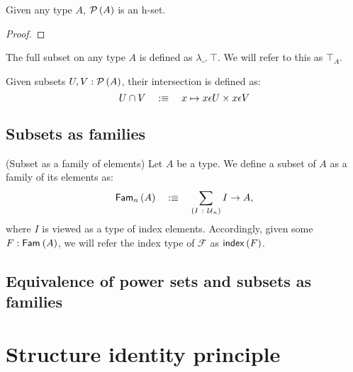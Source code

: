\begin{prop}\label{isSetPow}
  Given any type $A$, $\mathcal{P}\left(A\right)$ is an h-set.
\end{prop}
\begin{proof}
\end{proof}

\begin{defn}\label{defn:full-set}
  The full subset on any type $A$ is defined as $\lambda\_.~ \top$. We will refer to this as $\top_A$.
\end{defn}

\begin{defn}\label{defn:set-intersection}
  Given subsets $U, V : \mathcal{P}\left(A\right)$, their intersection is defined as:
  \begin{equation*}
    U \cap V \quad:\equiv\quad x \mapsto x \epsilon U \times x \epsilon V
  \end{equation*}
\end{defn}

\subsection{Subsets as families}

\begin{defn}(Subset as a family of elements)\label{defn:fam}
  Let $A$ be a type. We define a subset of $A$ as a family of its elements as:
  \begin{equation*}
    \mathsf{Fam}_{n}\left(A\right) \quad:\equiv\quad \sum_{(I~:~\mathcal{U}{}_n)} I \rightarrow A,
  \end{equation*}
  where $I$ is viewed as a type of index elements. Accordingly, given some $F : \mathsf{Fam}_{}\left(A\right)$,
  we will refer the index type of $\mathcal{F}$ as $\mathsf{index}{}\left(F\right)$.
\end{defn}

\subsection{Equivalence of power sets and subsets as families}


\section{Structure identity principle}\label{sec:sip}
